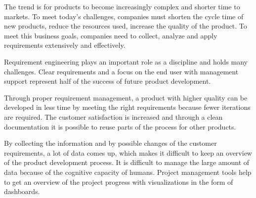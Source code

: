     The trend is for products to become increasingly complex and shorter time to markets.
    To meet today's challenges, companies must shorten the cycle time of new products, reduce the resources used, increase the quality of the product. To meet this business goals, companies need to collect, analyze and apply requirements extensively and effectively.~\cite{Ahti2005}

    Requirement engineering plays an important role as a discipline and holds many challenges. Clear requirements and a focus on the end user with management support represent half of the success of future product development.~\cite{6226784}

    Through proper requirement management, a product with higher quality can be developed in less time by meeting the right requirements because fewer iterations are required. The customer satisfaction is increased and through a clean documentation it is possible to reuse parts of the process for other products.~\cite{BAXTER2008585}

    By collecting the information and by possible changes of the customer requirements, a lot of data comes up, which makes it difficult to keep an overview of the product development process. It is difficult to manage the large amount of data because of the cognitive capacity of humans. Project management tools help to get an overview of the project progress with visualizations in the form of dashboards.~\cite{RICHTER2020271}

